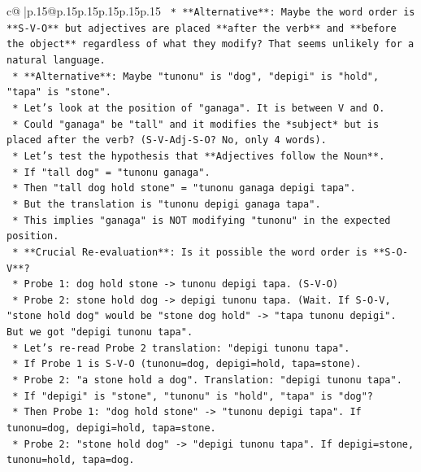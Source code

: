 \documentclass{article}
\begin{document}
{\begin{supertabular}{c@{$\;$}|p{.15\linewidth}@{}p{.15\linewidth}p{.15\linewidth}p{.15\linewidth}p{.15\linewidth}p{.15\linewidth}}
{{{\texttt{        *   **Alternative**: Maybe the word order is **S{-}V{-}O** but adjectives are placed **after the verb** and **before the object** regardless of what they modify? That seems unlikely for a natural language.} \\
\texttt{        *   **Alternative**: Maybe "tunonu" is "dog", "depigi" is "hold", "tapa" is "stone".} \\
\texttt{        *   Let's look at the position of "ganaga". It is between V and O.} \\
\texttt{        *   Could "ganaga" be "tall" and it modifies the *subject* but is placed after the verb? (S{-}V{-}Adj{-}S{-}O? No, only 4 words).} \\
\texttt{        *   Let's test the hypothesis that **Adjectives follow the Noun**.} \\
\texttt{            *   If "tall dog" = "tunonu ganaga".} \\
\texttt{            *   Then "tall dog hold stone" = "tunonu ganaga depigi tapa".} \\
\texttt{            *   But the translation is "tunonu depigi ganaga tapa".} \\
\texttt{            *   This implies "ganaga" is NOT modifying "tunonu" in the expected position.} \\
\texttt{        *   **Crucial Re{-}evaluation**: Is it possible the word order is **S{-}O{-}V**?} \\
\texttt{            *   Probe 1: dog hold stone {-}> tunonu depigi tapa. (S{-}V{-}O)} \\
\texttt{            *   Probe 2: stone hold dog {-}> depigi tunonu tapa. (Wait. If S{-}O{-}V, "stone hold dog" would be "stone dog hold" {-}> "tapa tunonu depigi". But we got "depigi tunonu tapa".} \\
\texttt{            *   Let's re{-}read Probe 2 translation: "depigi tunonu tapa".} \\
\texttt{            *   If Probe 1 is S{-}V{-}O (tunonu=dog, depigi=hold, tapa=stone).} \\
\texttt{            *   Probe 2: "a stone hold a dog". Translation: "depigi tunonu tapa".} \\
\texttt{            *   If "depigi" is "stone", "tunonu" is "hold", "tapa" is "dog"?} \\
\texttt{                *   Then Probe 1: "dog hold stone" {-}> "tunonu depigi tapa". If tunonu=dog, depigi=hold, tapa=stone.} \\
\texttt{                *   Probe 2: "stone hold dog" {-}> "depigi tunonu tapa". If depigi=stone, tunonu=hold, tapa=dog.} \\
}}}
\end{supertabular}}
\end{document}
